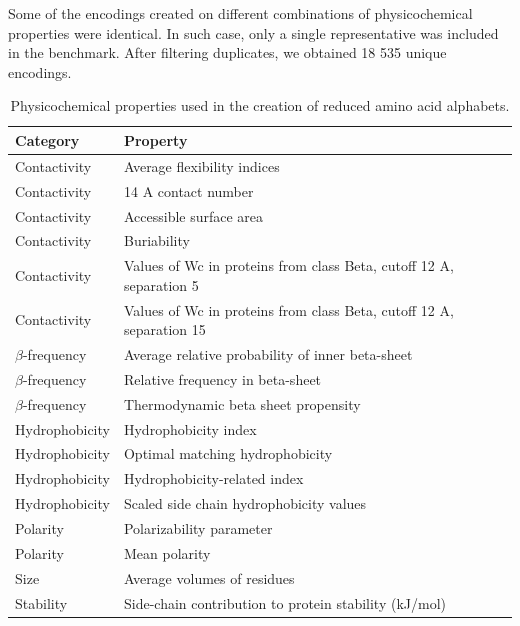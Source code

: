 \documentclass{bioinfo}
\begin{document}
\begin{methods}
  Some of the encodings created on different combinations of physicochemical 
properties were identical. In such case, only a single representative was 
included in the benchmark. After filtering duplicates, we obtained 18 535 unique 
encodings.

\begin{table}[bth]
\centering
\begin{tabular}{ll}
  \hline
Category & Property \\ 
  \hline
  Contactivity & Average flexibility indices \citep{bhaskaran_positional_1988} \\ 
  Contactivity & 14 A contact number \citep{nishikawa_radial_1986} \\ 
  Contactivity & Accessible surface area \citep{radzicka_comparing_1988} \\ 
    Contactivity & Buriability \citep{zhou_quantifying_2004} \\ 
  Contactivity & Values of Wc in proteins from class Beta, cutoff 12 A, separation 5 \citep{wozniak_characteristics_2014} \\ 
  Contactivity & Values of Wc in proteins from class Beta, cutoff 12 A, separation 15 \citep{wozniak_characteristics_2014} \\ 
  $\beta$-frequency & Average relative probability of inner beta-sheet \citep{kanehisa_local_1980} \\ 
  $\beta$-frequency & Relative frequency in beta-sheet \citep{prabhakaran_distribution_1990} \\ 
  $\beta$-frequency & Thermodynamic beta sheet propensity \citep{kim_thermodynamic_1993} \\ 
  Hydrophobicity & Hydrophobicity index \citep{argos_structural_1982} \\ 
  Hydrophobicity & Optimal matching hydrophobicity \citep{sweet_correlation_1983} \\ 
  Hydrophobicity & Hydrophobicity-related index \citep{kidera_statistical_1985} \\ 
  Hydrophobicity & Scaled side chain hydrophobicity values \citep{black_development_1991} \\ 
  Polarity & Polarizability parameter \citep{charton_structural_1982} \\ 
  Polarity & Mean polarity \citep{radzicka_comparing_1988} \\ 
  Size & Average volumes of residues \citep{pontius_deviations_1996} \\ 
  Stability & Side-chain contribution to protein stability (kJ/mol) \citep{takano_new_2001} \\ 
   \hline
\end{tabular}
\caption{Physicochemical properties used in the creation of reduced amino acid alphabets.} 
\end{table}


\end{methods}
\end{document}

